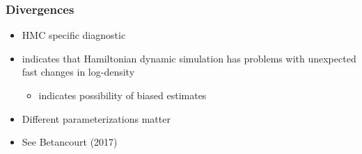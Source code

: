 \documentclass[10pt]{beamer}
\begin{document}
\begin{frame}
\frametitle{Divergences}

  \begin{itemize}
  \item HMC specific diagnostic
  \item indicates that Hamiltonian dynamic simulation
    has problems with unexpected fast changes in log-density
  \begin{itemize}
  \item indicates possibility of biased estimates
  \end{itemize}
  \item Different parameterizations matter
  \item See Betancourt (2017)

\end{itemize}
\end{frame}
\end{document}
